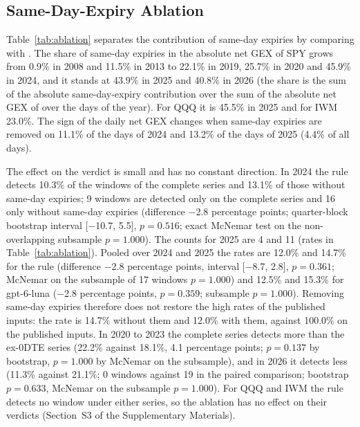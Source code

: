 \subsection{Same-Day-Expiry Ablation}
\label{sec:results:ablation}

Table~\ref{tab:ablation} separates the contribution of same-day expiries by comparing  with .
The share of same-day expiries in the absolute net GEX of SPY grows from 0.9\% in 2008 and 11.5\% in 2013 to 22.1\% in 2019, 25.7\% in 2020 and 45.9\% in 2024, and it stands at 43.9\% in 2025 and 40.8\% in 2026 (the share is the sum of the absolute same-day-expiry contribution over the sum of the absolute net GEX of  over the days of the year). For QQQ it is 45.5\% in 2025 and for IWM 23.0\%. The sign of the daily net GEX changes when same-day expiries are removed on 11.1\% of the days of 2024 and 13.2\% of the days of 2025 (4.4\% of all days).

The effect on the verdict is small and has no constant direction. In 2024 the rule detects 10.3\% of the windows of the complete series and 13.1\% of those without same-day expiries; 9 windows are detected only on the complete series and 16 only without same-day expiries (difference $-$2.8 percentage points; quarter-block bootstrap interval [$-$10.7, 5.5], $p=0.516$; exact McNemar test on the non-overlapping subsample $p=1.000$). The counts for 2025 are 4 and 11 (rates in Table~\ref{tab:ablation}). Pooled over 2024 and 2025 the rates are 12.0\% and 14.7\% for the rule (difference $-$2.8 percentage points, interval [$-$8.7, 2.8], $p=0.361$; McNemar on the subsample of 17 windows $p=1.000$) and 12.5\% and 15.3\% for gpt-6-luna ($-$2.8 percentage points, $p=0.359$; subsample $p=1.000$). Removing same-day expiries therefore does not restore the high rates of the published inputs: the rate is 14.7\% without them and 12.0\% with them, against 100.0\% on the published inputs. In 2020 to 2023 the complete series detects more than the ex-0DTE series (22.2\% against 18.1\%, 4.1 percentage points; $p=0.137$ by bootstrap, $p=1.000$ by McNemar on the subsample), and in 2026 it detects less (11.3\% against 21.1\%; 0 windows against 19 in the paired comparison; bootstrap $p=0.633$, McNemar on the subsample $p=1.000$). For QQQ and IWM the rule detects no window under either series, so the ablation has no effect on their verdicts (Section~S3 of the Supplementary Materials).

